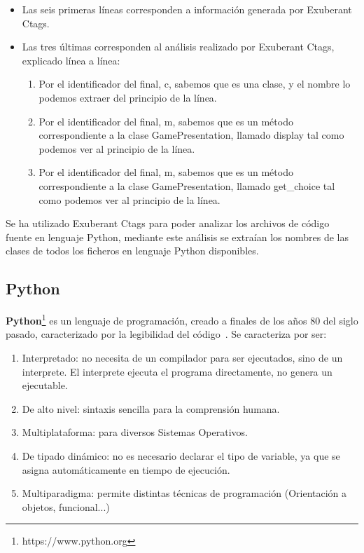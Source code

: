 \documentclass[a4paper, 12pt]{book}
\begin{document}
\begin{itemize}
  \item Las seis primeras líneas corresponden a información generada por Exuberant Ctags.
  \item Las tres últimas corresponden al análisis realizado por Exuberant Ctags, explicado línea a línea:
  \begin{enumerate}
    \item Por el identificador del final, c, sabemos que es una clase, y el nombre lo podemos extraer del principio de la línea.
    \item Por el identificador del final, m, sabemos que es un método correspondiente a la clase GamePresentation, llamado display tal como podemos ver al principio de la línea.
    \item Por el identificador del final, m, sabemos que es un método correspondiente a la clase GamePresentation, llamado get\_choice tal como podemos ver al principio de la línea.
  \end{enumerate}
\end{itemize}

Se ha utilizado Exuberant Ctags para poder analizar los archivos de código fuente en lenguaje Python, mediante este análisis se extraían los nombres de las clases de todos los ficheros en lenguaje Python disponibles.


\subsection{Python}
\label{subsec:python}
\textbf{Python}\footnote{https://www.python.org} es un lenguaje de programación, creado a finales de los años 80 del siglo pasado, caracterizado
por la legibilidad del código~\cite{van2003python,summerfield2010programming}. Se caracteriza por ser:
\begin{enumerate}
  \item Interpretado: no necesita de un compilador para ser ejecutados, sino de un interprete. El interprete
  ejecuta el programa directamente, no genera un ejecutable.
  \item De alto nivel: sintaxis sencilla para la comprensión humana.
  \item Multiplataforma: para diversos Sistemas Operativos.
  \item De tipado dinámico: no es necesario declarar el tipo de variable, ya que se asigna
  automáticamente en tiempo de ejecución.
  \item Multiparadigma: permite distintas técnicas de programación (Orientación a objetos, funcional...)
\end{enumerate}
\end{document}
